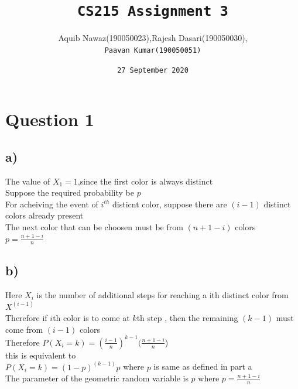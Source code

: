 \documentclass{article}
\title{\huge\texttt{CS215 Assignment 3}}
\author{Aquib Nawaz(190050023),Rajesh Dasari(190050030),\\\texttt{Paavan Kumar(190050051)}}
\date{\texttt{27 September 2020}}
\begin{document}
\maketitle

\section* {Question 1}
\subsection* {a)}
The value of $X_1 = 1$,since the first color is always distinct\\
Suppose the required probability be $p$\\
For acheiving the event of $i^{th}$ disticnt color, suppose there are $(i-1)$ distinct colors already present\\
The next color that can be choosen must be from $(n+1-i)$ colors\\
$p = \frac{n+1-i}{n}$\\
\subsection* {b)}
Here $X_i$ is the number of additional steps for reaching a ith distinct color from $X^{(i-1)}$\\
Therefore if $i$th color is to come at $k$th step , then the remaining $(k-1)$ must come from $(i-1)$ colors\\
Therefore $P(X_i = k) = {(\frac{i-1}{n})}^{k-1}( \frac{n+1-i}{n}$)\\
this is equivalent to \\
$P(X_i = k) = {(1-p)}^{(k-1)}p$ where $p$ is same as defined in part a \\
The parameter of the geometric random variable is $p$ where $p =  \frac{n+1-i}{n} $
\end{document}
